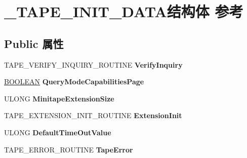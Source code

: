 \hypertarget{struct___t_a_p_e___i_n_i_t___d_a_t_a}{}\section{\+\_\+\+T\+A\+P\+E\+\_\+\+I\+N\+I\+T\+\_\+\+D\+A\+T\+A结构体 参考}
\label{struct___t_a_p_e___i_n_i_t___d_a_t_a}
\subsection*{Public 属性}
\begin{DoxyCompactItemize}
\item 
\mbox{\label{struct___t_a_p_e___i_n_i_t___d_a_t_a_ac11210e52994bd611d6921336aa22beb}} 
T\+A\+P\+E\+\_\+\+V\+E\+R\+I\+F\+Y\+\_\+\+I\+N\+Q\+U\+I\+R\+Y\+\_\+\+R\+O\+U\+T\+I\+NE {\bfseries Verify\+Inquiry}
\item 
\mbox{\label{struct___t_a_p_e___i_n_i_t___d_a_t_a_af4cd6a8da4a96bec3808a1787ad4a15c}} 
\hyperlink{_processor_bind_8h_a112e3146cb38b6ee95e64d85842e380a}{B\+O\+O\+L\+E\+AN} {\bfseries Query\+Mode\+Capabilities\+Page}
\item 
\mbox{\label{struct___t_a_p_e___i_n_i_t___d_a_t_a_a977811f62229a411a76d90a31f770f8e}} 
U\+L\+O\+NG {\bfseries Minitape\+Extension\+Size}
\item 
\mbox{\label{struct___t_a_p_e___i_n_i_t___d_a_t_a_aa34ca551d0c12732357ca6e96003fbcf}} 
T\+A\+P\+E\+\_\+\+E\+X\+T\+E\+N\+S\+I\+O\+N\+\_\+\+I\+N\+I\+T\+\_\+\+R\+O\+U\+T\+I\+NE {\bfseries Extension\+Init}
\item 
\mbox{\label{struct___t_a_p_e___i_n_i_t___d_a_t_a_a92430061e1599e7eba0a908abd7fb11a}} 
U\+L\+O\+NG {\bfseries Default\+Time\+Out\+Value}
\item 
\mbox{\label{struct___t_a_p_e___i_n_i_t___d_a_t_a_a9f9b9db9286260d2a94bdb4fdfa2a847}} 
T\+A\+P\+E\+\_\+\+E\+R\+R\+O\+R\+\_\+\+R\+O\+U\+T\+I\+NE {\bfseries Tape\+Error}
\item 
\mbox{\label{struct___t_a_p_e___i_n_i_t___d_a_t_a_ab99ed4fdb7bb21892391f931429dc025}} 

\end{DoxyCompactItemize}
